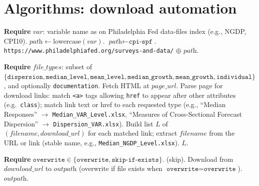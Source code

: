 \documentclass[11pt]{article}
\begin{document}
\section{Algorithms: download automation}

\begin{algorithm}[H]
\caption{\textsc{VariablePageURL}$(\textit{var})$}
\begin{algorithmic}[1]
\State \textbf{Require} $\textit{var}$: variable name as on Philadelphia Fed data-files index (e.g., NGDP, CPI10).
\State $\textit{path} \gets \text{lowercase}(\textit{var})$.
    \State $\textit{path} \gets \texttt{cpi-spf}$. 
\EndIf
\State \Return \texttt{https://www.philadelphiafed.org/surveys-and-data/} $\oplus$ $\textit{path}$.
\end{algorithmic}
\end{algorithm}

\begin{algorithm}[H]
\caption{\textsc{GetDownloadLinks}$(\textit{page\_url}, \textit{file\_types})$}
\begin{algorithmic}[1]
\State \textbf{Require} $\textit{file\_types}$: subset of
\Statex \quad $\{\texttt{dispersion}, \texttt{median\_level}, \texttt{mean\_level}, \texttt{median\_growth}, \texttt{mean\_growth}, \texttt{individual}\}$, and optionally \texttt{documentation}.
\State Fetch HTML at $\textit{page\_url}$.
\State Parse page for download links: match \texttt{<a>} tags allowing
\Statex \quad \texttt{href} to appear after other attributes (e.g.\ \texttt{class}); match link text or href to each requested type (e.g., ``Median Responses'' $\to$ \texttt{Median\_VAR\_Level.xlsx}, ``Measures of Cross-Sectional Forecast Dispersion'' $\to$ \texttt{Dispersion\_VAR.xlsx}).
\State Build list $L$ of $(\textit{filename}, \textit{download\_url})$ for each matched link; extract $\textit{filename}$ from the URL or link (stable name, e.g., \texttt{Median\_NGDP\_Level.xlsx}).
\State \Return $L$.
\end{algorithmic}
\end{algorithm}

\begin{algorithm}[H]
\caption{\textsc{DownloadOneFile}$(\textit{download\_url}, \textit{outpath}, \texttt{overwrite})$}
\begin{algorithmic}[1]
\State \textbf{Require} $\texttt{overwrite} \in \{\texttt{overwrite}, \texttt{skip-if-exists}\}$.
    \State \Return (skip).
\EndIf
\State Download from $\textit{download\_url}$ to $\textit{outpath}$ (overwrite if file exists when $\texttt{overwrite} = \texttt{overwrite}$).
\State \Return $\textit{outpath}$.
\end{algorithmic}
\end{algorithm}
\end{document}
